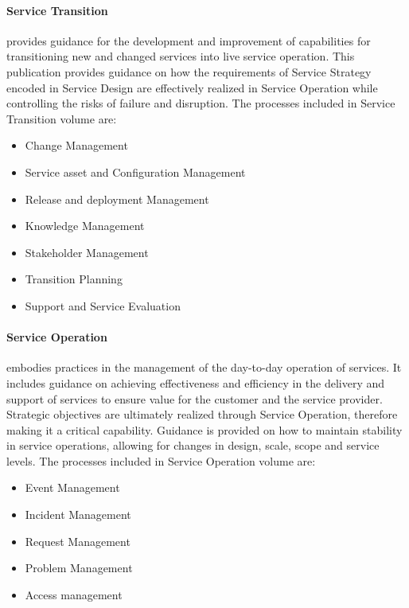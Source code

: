 \paragraph{\textbf{Service Transition}} provides guidance for the development and improvement of capabilities for transitioning new and changed services into live service operation. This publication provides guidance on how the requirements of Service Strategy encoded in Service Design are effectively realized in Service Operation while controlling the risks of failure and disruption.\cite{itilST} The processes included in Service Transition volume are:

\begin{itemize}
  \item Change Management
  \item Service asset and Configuration Management
  \item Release and deployment Management
  \item Knowledge Management
  \item Stakeholder Management
  \item Transition Planning 
  \item Support and Service Evaluation 
\end{itemize} 

\paragraph{\textbf{Service Operation}} embodies practices in the management of the day-to-day operation of services. It includes guidance on achieving effectiveness and efficiency in the delivery and support of services to ensure value for the customer and the service provider. Strategic objectives are ultimately realized through Service Operation, therefore making it a critical capability. Guidance is provided on how to maintain stability in service operations, allowing for changes in design, scale, scope and service levels.\cite{itilSO} The processes included in Service Operation volume are:

\begin{itemize}
  \item Event Management
  \item Incident Management
  \item Request Management
  \item Problem Management
  \item Access management
\end{itemize} 


